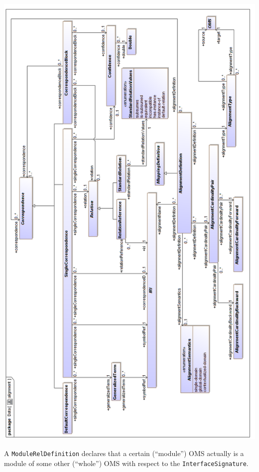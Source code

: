 \documentclass[10pt,fleqn,final]{scrreprt}
\newcommand*{\syntax}[1]{\texttt{#1}}
\newenvironment{definitions}[0]{\medskip }{}
\begin{document}
\begin{definitions}
\begin{center}
\includegraphics[scale=0.47]{mof/alignment.png}
\end{center}

A \syntax{ModuleRelDefinition} declares that a certain (``module'') OMS
actually is a module of some other (``whole'') OMS with respect
to the \syntax{InterfaceSignature}.



\end{definitions}
\end{document}
